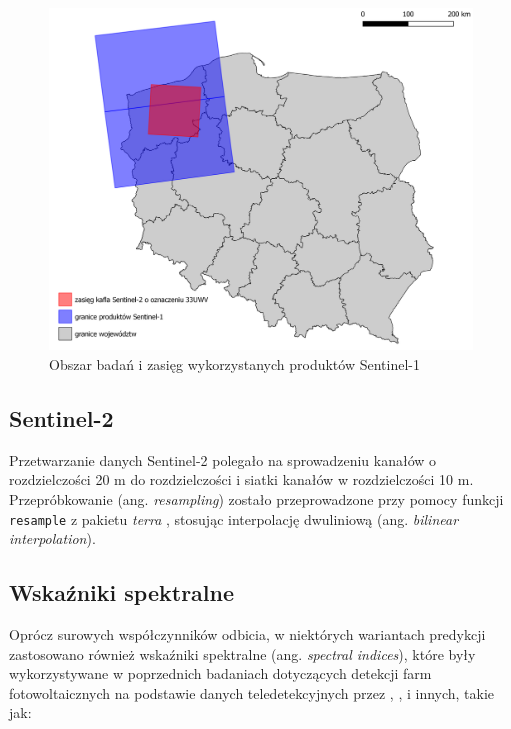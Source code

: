 \documentclass{amuthesis}
\begin{document}
\begin{figure}[t]

{\centering \includegraphics[width=1\textwidth,height=\textheight]{figures/sen1_extents.png}

}

\caption{\label{fig-rycina-s1-extents}Obszar badań i zasięg
wykorzystanych produktów Sentinel-1}

\end{figure}

\hypertarget{sec-processing-s2}{%
\subsection{Sentinel-2}\label{sec-processing-s2}}

Przetwarzanie danych Sentinel-2 polegało na sprowadzeniu kanałów o
rozdzielczości 20 m do rozdzielczości i siatki kanałów w rozdzielczości
10 m. Przepróbkowanie (ang. \emph{resampling}) zostało przeprowadzone
przy pomocy funkcji \texttt{resample} z pakietu \emph{terra}
\autocite{R-terra}, stosując interpolację dwuliniową (ang.
\emph{bilinear interpolation}).

\hypertarget{sec-spectral-indices}{%
\subsection{Wskaźniki spektralne}\label{sec-spectral-indices}}

Oprócz surowych współczynników odbicia, w niektórych wariantach
predykcji zastosowano również wskaźniki spektralne (ang. \emph{spectral
indices}), które były wykorzystywane w poprzednich badaniach dotyczących
detekcji farm fotowoltaicznych na podstawie danych teledetekcyjnych
przez \textcite{zhang_2021_texture}, \textcite{plakman_2022_pv},
\textcite{wang_2022_pv} i innych, takie jak:
\end{document}

